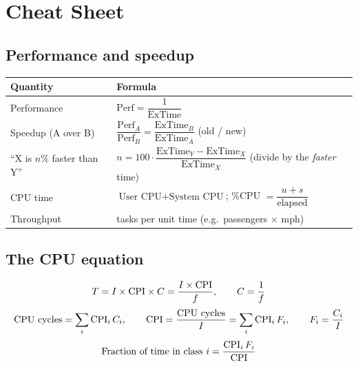 \documentclass[11pt]{article}
\begin{document}
\sloppy
{}

\section{Cheat Sheet}

\subsection{Performance and speedup}
\begin{center}
\renewcommand{\arraystretch}{2.3}
\begin{tabular}{@{}p{4.2cm}p{10.3cm}@{}}
\toprule
Quantity & Formula \\
\midrule
Performance & $\text{Perf} = \dfrac{1}{\text{ExTime}}$ \\
Speedup (A over B) & $\dfrac{\text{Perf}_A}{\text{Perf}_B} = \dfrac{\text{ExTime}_B}{\text{ExTime}_A}$ \quad (old / new) \\
``X is $n\%$ faster than Y'' & $n = 100\cdot\dfrac{\text{ExTime}_Y-\text{ExTime}_X}{\text{ExTime}_X}$ \quad (divide by the \emph{faster} time) \\
CPU time & $\text{User CPU} + \text{System CPU}$; \quad \%CPU $= \dfrac{u+s}{\text{elapsed}}$ \\
Throughput & tasks per unit time (e.g.\ passengers $\times$ mph) \\
\bottomrule
\end{tabular}
\end{center}

\subsection{The CPU equation}
\begin{theorem}
\[
  T = I \times \mathrm{CPI} \times C = \frac{I \times \mathrm{CPI}}{f},
  \qquad C = \frac{1}{f}
\]
\[
  \text{CPU cycles} = \sum_i \mathrm{CPI}_i \, C_i, \qquad
  \mathrm{CPI} = \frac{\text{CPU cycles}}{I} = \sum_i \mathrm{CPI}_i \, F_i, \qquad
  F_i = \frac{C_i}{I}
\]
\[
  \text{Fraction of time in class } i = \frac{\mathrm{CPI}_i\,F_i}{\mathrm{CPI}}
\]
\end{theorem}
\end{document}
